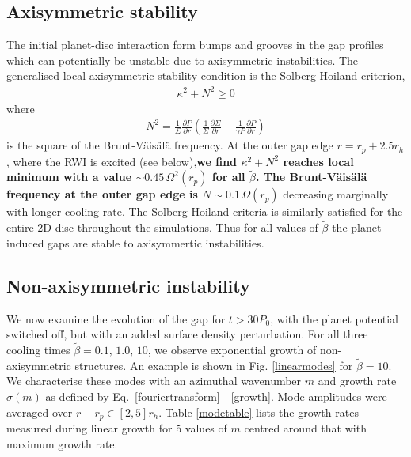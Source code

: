 \subsection{Axisymmetric stability}
The initial planet-disc interaction form bumps and grooves in the gap profiles
which can potentially be unstable due to axisymmetric instabilities. The
generalised local axisymmetric stability condition is the Solberg-Hoiland
criterion,  
\begin{align}
  \kappa^2+N^2 \geq 0 
\end{align}
where
\begin{align}
 N^2=\frac{1}{\Sigma} \frac{\partial P}{\partial r}
 \left(\frac{1}{\Sigma} \frac{\partial \Sigma}{\partial
     r}-\frac{1}{\gamma P} \frac{\partial P}{\partial r}  \right) 
\end{align}
is the square of the Brunt-V\"ais\"al\"a frequency. 
At the outer gap edge $r=r_p+2.5r_h$,  where the RWI is excited
(see below),{\bf  we find $\kappa^2 + N^2$ reaches local minimum with a value
$\sim 0.45 \, \Omega^2(r_p)$
 for all $\tilde\beta$. The
Brunt-V\"ais\"al\"a frequency at the outer gap edge is
$N\sim 0.1 \, \Omega(r_p)$} 
decreasing marginally with longer cooling rate. 
The Solberg-Hoiland criteria is similarly satisfied for the entire 2D disc throughout the 
simulations.
Thus for all values of $\tilde\beta$ the planet-induced gaps are
stable to axisymmertic instabilities. 



\subsection{Non-axisymmetric instability}\label{linear}
We now examine the evolution of the gap for $t>30P_0$, with the
planet potential switched off, but with an added surface density
perturbation. For all three cooling times $\tilde{\beta}=0.1,\, 1.0,\,
10$, we observe exponential growth of non-axisymmetric
structures. An example is shown in Fig. \ref{linearmodes} for 
$\tilde{\beta}=10$. We characterise these
modes with an azimuthal wavenumber $m$ and growth rate $\sigma(m)$ as defined by
Eq.~\ref{fouriertransform}---\ref{growth}. Mode amplitudes were
averaged over $r-r_p\in[2,5]r_h$. Table \ref{modetable}
lists the growth rates measured during 
linear growth for 5 values of $m$ centred around that with maximum
growth rate. 

